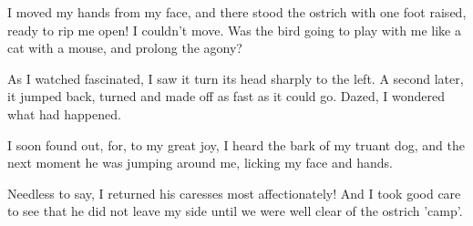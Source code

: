 \par
I moved my hands from my face, and there stood the ostrich with one foot raised, ready to rip me open! I couldn't move. Was the bird going to play with me like a cat with a mouse, and prolong the agony?
\par
As I watched fascinated, I saw it turn its head sharply to the left. A second later, it jumped back, turned and made off as fast as it could go. Dazed, I wondered what had happened.
\par
I soon found out, for, to my great joy, I heard the bark of my truant dog, and the next moment he was jumping around me, licking my face and hands.
\par
Needless to say, I returned his caresses most affectionately! And I took good care to see that he did not leave my side until we were well clear of the ostrich 'camp'.
